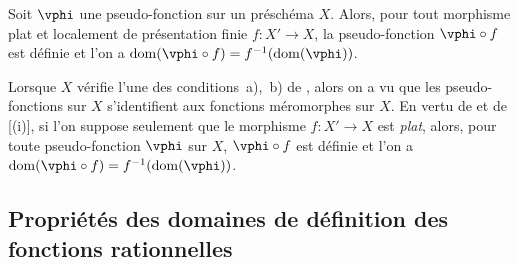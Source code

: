 \begin{corollary}[20.3.12]
\label{IV.20.3.12}
Soit $\vphi$ une pseudo-fonction sur un préschéma $X$.
Alors, pour tout morphisme plat et localement de présentation finie $f:X'\to X$, la pseudo-fonction $\vphi\circ f$ est définie et l'on a $\operatorname{dom}(\vphi\circ f)=f^{-1}(\operatorname{dom}(\vphi))$.
\end{corollary}

\begin{remark}[20.3.13]
\label{IV.20.3.13}
Lorsque $X$ vérifie l'une des conditions~a),~b) de , alors on a vu  que les pseudo-fonctions sur $X$ s'identifient aux fonctions méromorphes sur $X$.
En vertu de  et de [(i)], si l'on suppose seulement que le morphisme $f:X'\to X$ est \emph{plat}, alors, pour toute pseudo-fonction $\vphi$ sur $X$, $\vphi\circ f$ est définie et l'on a $\operatorname{dom}(\vphi\circ f)=f^{-1}(\operatorname{dom}(\vphi))$.
\end{remark}

\subsection{Propriétés des domaines de définition des fonctions rationnelles}
\label{IV.20.4}

